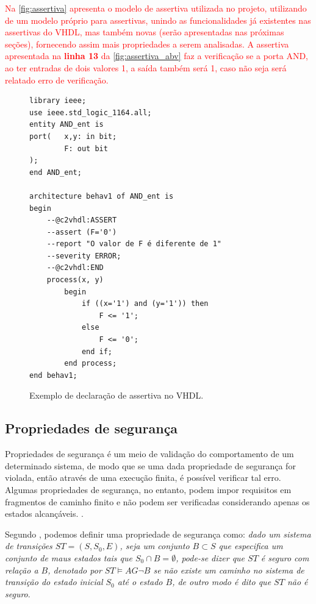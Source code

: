 \par
\textcolor{red}{Na \autoref{fig:assertiva} apresenta o modelo de assertiva utilizada no projeto, utilizando de um modelo próprio para assertivas, unindo as funcionalidades já existentes nas assertivas do VHDL, mas também novas (serão apresentadas nas próximas seções), fornecendo assim mais propriedades a serem analisadas. A assertiva apresentada na \textbf{linha 13} da \autoref{fig:assertiva_abv} faz a verificação se a porta AND, ao ter entradas de dois valores 1, a saída também será 1, caso não seja será relatado erro de verificação.}

\begin{figure}[H]
\caption{\label{fig:assertiva_abv} Exemplo de declaração de assertiva no VHDL.}
	\begin{center}
    \begin{minipage}{0.9\textwidth}
    \begin{lstlisting}       
library ieee;
use ieee.std_logic_1164.all;
entity AND_ent is
port(   x,y: in bit;
        F: out bit
);
end AND_ent;

architecture behav1 of AND_ent is
begin
	--@c2vhdl:ASSERT
    --assert (F='0')
    --report "O valor de F é diferente de 1"
    --severity ERROR;
    --@c2vhdl:END
	process(x, y)
    	begin
        	if ((x='1') and (y='1')) then
            	F <= '1';
        	else
            	F <= '0';
        	end if;
    	end process;
end behav1;

\end{lstlisting}
    \end{minipage}
	\end{center}
\end{figure}

\subsection{Propriedades de segurança}

Propriedades de segurança é um meio de validação do comportamento de um determinado sistema, de modo que se uma dada propriedade de segurança for violada, então através de uma execução finita, é possível verificar tal erro. Algumas propriedades de segurança, no entanto, podem impor requisitos em fragmentos de caminho finito e não podem ser verificadas considerando apenas os estados alcançáveis. \cite{baier2008principles}.

\par
Segundo \cite{clarke2003verification}, podemos definir uma propriedade de segurança como: \textit{dado um sistema de transições $ST = (S, S_0, E)$, seja um conjunto $B \subset S$ que especifica um conjunto de maus estados tais que $S_0 \cap B = \emptyset$, pode-se dizer que $ST$ é seguro com relação a $B$, denotado por $ST \models AG\neg B$ se não existe um caminho no sistema de transição do estado inicial $S_0$ até o estado $B$, de outro modo é dito que $ST$ não é seguro}.

